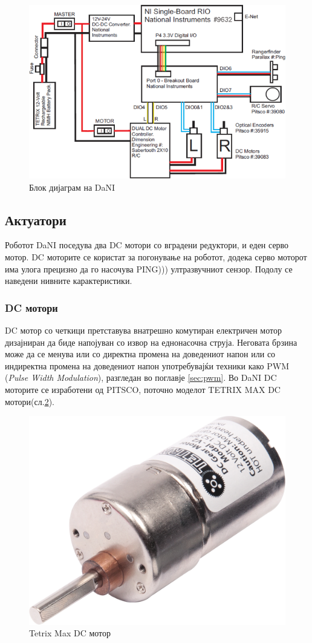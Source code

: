 \documentclass[11pt]{article}
\begin{document}
	\begin{figure}[h]
		\includegraphics[width=0.75\linewidth]{./images/dani_block_diagram.png}
		\centering
		\caption{Блок дијаграм на DaNI}
		\label{fig:dani_block_diagram}
		\end{figure}

	\subsection{Актуатори}
		Роботот DaNI поседува два DC мотори со вградени редуктори, и еден серво мотор. DC моторите се користат за погонување на роботот, додека серво моторот има улога прецизно да го насочува PING))) ултразвучниот сензор. Подолу се наведени нивните карактеристики.

	  \subsubsection{DC мотори}
		  DC мотор со четкици претставува внатрешно комутиран електричен мотор дизајниран да биде напојуван со извор на еднонасочна струја. Неговата брзина може да се менува или со директна промена на доведениот напон или со индиректна промена на доведениот напон употребувајќи техники како PWM (\textit{Pulse Width Modulation}), разгледан во поглавје \ref{sec:pwm}.
		  Во DaNI DC моторите се изработени од PITSCO, поточно моделот TETRIX MAX DC мотори(сл.\ref{fig:dc_motor_iso.png}).

		  \begin{figure}[H]
    	  \includegraphics[width=0.35\linewidth]{./images/dc_motor_iso.png}
			  \centering
			  \caption{Tetrix Max DC мотор}
			  \label{fig:dc_motor_iso.png}
			  \end{figure}
\end{document}
